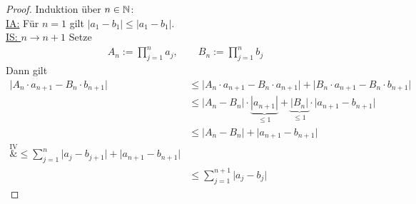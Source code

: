 \begin{proof}
	Induktion über $n\in\mathbb{N}$:\\
	\underline{IA:} Für $n=1$ gilt $|a_1-b_1|\leq|a_1-b_1|$.\\
	\underline{IS: $n\to n+1$}
	Setze
	\begin{align*}
		A_n:=\prod\limits_{j=1}^na_j,\qquad B_n:=\prod\limits_{j=1}^n b_j
	\end{align*}
	Dann gilt
	\begin{align*}
		\big| A_n\cdot a_{n+1}-B_n\cdot b_{n+1}\big|
		&\leq\big|A_n\cdot a_{n+1}-B_n\cdot a_{n+1}\big|+\big|B_n\cdot a_{n+1}-B_n\cdot b_{n+1}\big|\\
		&\leq\big|A_n-B_n\big|\cdot\underbrace{|a_{n+1}|}_{\leq1}+\underbrace{|B_n|}_{\leq 1}\cdot\big|a_{n+1}-b_{n+1}\big|\\
		&\leq\big|A_n-B_n\big|+\big|a_{n+1}-b_{n+1}\big|\\
		\overset{\text{IV}}&\leq
		\sum\limits_{j=1}^n\big|a_j-b_{j+1}\big|+\big|a_{n+1}-b_{n+1}\big|\\
		&\leq\sum\limits_{j=1}^{n+1}\big|a_j-b_{j}\big|
	\end{align*}
\end{proof}

